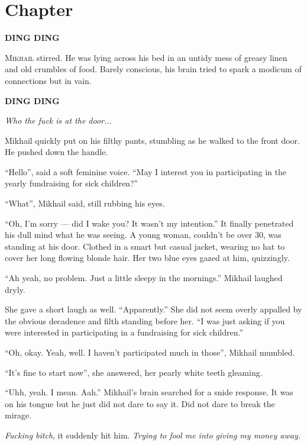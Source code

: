 \chapter{Chapter \thechapter}

\begin{center}
\textbf{DING DING}
\end{center}

\lettrine[lraise=0.1, nindent=0.1em, slope=-.5em]{M}{ikhail} stirred. He was lying across his bed in an untidy mess of greasy linen and old crumbles of food. Barely conscious, his brain tried to spark a modicum of connections but in vain.

\begin{center}
\textbf{DING DING}
\end{center}

\textit{Who the fuck is at the door...}

Mikhail quickly put on his filthy pants, stumbling as he walked to the front door. He pushed down the handle.

“Hello”, said a soft feminine voice. “May I interest you in participating in the yearly fundraising for sick children?”

“What”, Mikhail said, still rubbing his eyes.

“Oh, I’m sorry — did I wake you? It wasn’t my intention.” It finally penetrated his dull mind what he was seeing. A young woman, couldn’t be over 30, was standing at his door. Clothed in a smart but casual jacket, wearing no hat to cover her long flowing blonde hair. Her two blue eyes gazed at him, quizzingly.

“Ah yeah, no problem. Just a little sleepy in the mornings.” Mikhail laughed dryly. 

She gave a short laugh as well. “Apparently.” She did not seem overly appalled by the obvious decadence and filth standing before her. “I was just asking if you were interested in participating in a fundraising for sick children.”

“Oh, okay. Yeah, well. I haven’t participated much in those”, Mikhail mumbled.

“It’s fine to start now”, she answered, her pearly white teeth gleaming.

“Uhh, yeah. I mean. Aah.” Mikhail’s brain searched for a snide response. It was on his tongue but he just did not dare to say it. Did not dare to break the mirage.

\textit{Fucking bitch}, it suddenly hit him. \textit{Trying to fool me into giving my money away.}


